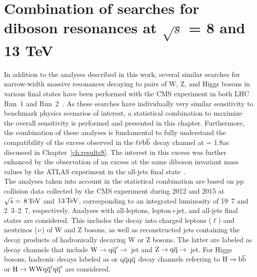 \chapter{Combination of searches for diboson resonances at $\sqrt{s}$ = 8 and 13 TeV}
\label{ch:combination}

In addition to the analyses described in this work, several similar searches for narrow-width massive resonances decaying to pairs of W, Z, and Higgs bosons in various final states have been performed with the CMS experiment in both LHC Run~1 and Run~2~\cite{CMS-PAS-EXO-15-002,Khachatryan:2016cfx,Khachatryan:2014gha, Khachatryan:2014hpa, Khachatryan:2015bma, Khachatryan:2014xja,Khachatryan:2016yji,Khachatryan:2015ywa}.
As these searches have individually very similar sensitivity to benchmark physics scenarios of interest, a statistical combination to maximize the overall sensitivity is performed and presented in this chapter.
Furthermore, the combination of these analyses is fundamental to fully understand the compatibility of the excess observed in the $\ell\nu{\mathrm{b}\overline{\mathrm{b}}}$ decay channel at \mWH = 1.8\TeV as discussed in Chapter~\ref{ch:results8}.
The interest in this excess was further enhanced by the observation of an excess at the same diboson invariant mass values by the ATLAS experiment in the all-jets final state~\cite{Aad:2015owa}.\\

The analyses taken into account in the statistical combination are based on pp collision data collected by the CMS experiment during 2012 and 2015 at $\sqrt{s} = \text{\,8}{\ensuremath{\,\text{Te\hspace{-.08em}V}}}$ and $\text{\,13}{\ensuremath{\,\text{Te\hspace{-.08em}V}}}$, corresponding to an integrated luminosity of \unit{19.7}{\fbinv} and \unit{2.3}--\unit{2.7}{\fbinv}, respectively.
Analyses with all-leptons, lepton+jet, and all-jets final states are considered. This includes the decay into charged leptons ($\ell$) and neutrinos ($\nu$) of W and Z bosons, as well as reconstructed jets containing the decay products of hadronically decaying W or Z bosons. The latter are labeled as \qqbar decay channels that include $\rm W\to\mathrm{q}\overline{\mathrm{q}}'\to$~jet and $\rm Z\to\mathrm{q}\overline{\mathrm{q}}\to$~jet. For Higgs bosons, hadronic decays labeled as \bbbar or $\mathrm{q}\overline{\mathrm{q}}\mathrm{q}\overline{\mathrm{q}}$ decay channels referring to $\rm H\to{\mathrm{b}\overline{\mathrm{b}}}$ or $\rm H\to\mathrm{W}\mathrm{W}\mathrm{q}\overline{\mathrm{q}}^\prime\mathrm{q}\overline{\mathrm{q}}^\prime$ are considered.

